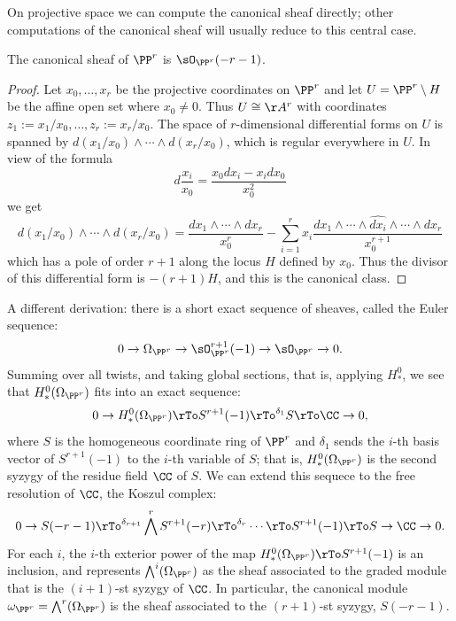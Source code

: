 On projective space we can compute the canonical sheaf directly; other computations of the canonical sheaf will usually reduce to this central case.

\begin{theorem}
 The canonical sheaf of $\PP^{r}$ is $\sO_{\PP^{r}}(-r-1)$. 
\end{theorem}
\begin{proof}
Let $x_{0}, \dots, x_{r}$ be the projective coordinates on $\PP^{r}$ and let  $U = \PP^{r}\setminus H$ be the affine open set where $x_{0} \neq 0$. Thus $U \cong \AA^{r}$ with coordinates $z_{1} := x_{1}/x_{0}, \dots, z_{r}:=x_{r}/x_{0}$. The space of $r$-dimensional differential forms on $U$ is spanned by $d(x_{1}/x_{0})\wedge\cdots\wedge d(x_{r}/x_{0})$, which is regular everywhere in $U$. In view of the formula
$$
d\frac{x_{i}}{x_{0}} = \frac{x_{0}dx_{i}-x_{i}dx_{0}}{x_{0}^{2}}
$$
we get
$$
d(x_{1}/x_{0})\wedge\cdots\wedge d(x_{r}/x_{0}) = \frac{dx_{1}\wedge\cdots\wedge dx_{r}}{x_{0}^{r}}-
\sum_{i=1}^{r} x_{i} \frac{ dx_{1}\wedge\cdots \wedge \widehat{dx_{i}}\wedge \cdots \wedge dx_{r}}{x_{0}^{r+1}}
$$
which has a pole of order $r+1$ along the locus $H$ defined by $x_{0}$. Thus the divisor of this differential form
is $-(r+1)H$, and this is the canonical class.
\end{proof}

\begin{fact}
A different derivation: there is a short exact sequence of sheaves, called the Euler sequence:
$$
0\to \Omega_{\PP^{r}} \to \sO_{\PP^{r}}^{r+1} (-1) \to \sO_{\PP^{r}} \to 0.
$$
Summing over all twists, and taking global sections, that is, applying $H^0_*$, we see that 
$H^0_*(\Omega_{\PP^{r}})$ fits into an exact sequence:
$$
0 \to H^0_*(\Omega_{\PP^{r}}) \rTo S^{r+1}(-1) \rTo^{\delta_{1}} S \rTo \CC \to 0,
$$
where $S$ is the homogeneous coordinate ring of $\PP^r$ and $\delta_1$ sends the $i$-th basis vector of
$S^{r+1}(-1)$ to the $i$-th variable of $S$; that is, $H^0_*(\Omega_{\PP^{r}})$ is the second syzygy of the residue field $\CC$ of $S$. We can extend this sequece to  the free resolution
of $\CC$, the Koszul complex:
$$
0 \to S(-r-1) \rTo^{\delta_{r+1}} \bigwedge^rS^{r+1}(-r) \rTo^{\delta_{r}} \cdots \rTo S^{r+1}(-1) \rTo S \to \CC \to 0.
$$
For each $i$, the $i$-th exterior power of the map $H^0_*(\Omega_{\PP^{r}}) \rTo S^{r+1}(-1)$ is an inclusion, and
represents $\bigwedge^i(\Omega_{\PP^{r}})$ as the sheaf associated to the graded module that is the $(i+1)$-st syzygy of $\CC$.
In particular, the canonical module $\omega_{\PP^r} = \bigwedge^r(\Omega_{\PP^{r}})$ is the sheaf associated to the 
$(r+1)$-st syzygy, $S(-r-1)$.
\end{fact}

